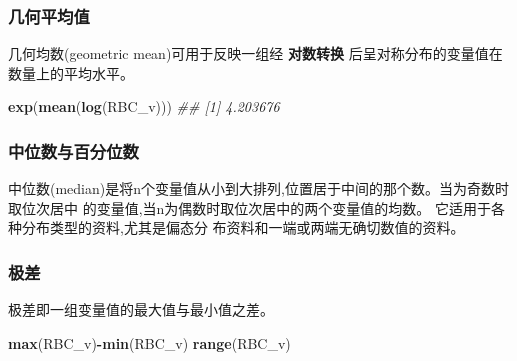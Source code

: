 \documentclass[
]{article}
\newenvironment{Shaded}{\begin{snugshade}}{\end{snugshade}}
\newcommand{\CommentTok}[1]{\textcolor[rgb]{0.56,0.35,0.01}{\textit{#1}}}
\newcommand{\FloatTok}[1]{\textcolor[rgb]{0.00,0.00,0.81}{#1}}
\newcommand{\KeywordTok}[1]{\textcolor[rgb]{0.13,0.29,0.53}{\textbf{#1}}}
\newcommand{\NormalTok}[1]{#1}
\newcommand{\OperatorTok}[1]{\textcolor[rgb]{0.81,0.36,0.00}{\textbf{#1}}}
\begin{document}
\hypertarget{ux51e0ux4f55ux5e73ux5747ux503c}{%
\subsubsection{几何平均值}\label{ux51e0ux4f55ux5e73ux5747ux503c}}

几何均数(geometric mean)可用于反映一组经 \textbf{对数转换} 后呈对称分布的变量值在数量上的平均水平。

\begin{Shaded}
\begin{Highlighting}[]
\KeywordTok{exp}\NormalTok{(}\KeywordTok{mean}\NormalTok{(}\KeywordTok{log}\NormalTok{(RBC_v)))}
\CommentTok{## [1] 4.203676}
\end{Highlighting}
\end{Shaded}

\hypertarget{ux4e2dux4f4dux6570ux4e0eux767eux5206ux4f4dux6570}{%
\subsubsection{中位数与百分位数}\label{ux4e2dux4f4dux6570ux4e0eux767eux5206ux4f4dux6570}}

中位数(median)是将n个变量值从小到大排列,位置居于中间的那个数。当为奇数时取位次居中 的变量值,当n为偶数时取位次居中的两个变量值的均数。
它适用于各种分布类型的资料,尤其是偏态分 布资料和一端或两端无确切数值的资料。

\begin{Shaded}
\end{Shaded}

\hypertarget{ux6781ux5dee}{%
\subsubsection{极差}\label{ux6781ux5dee}}

极差即一组变量值的最大值与最小值之差。

\begin{Shaded}
\begin{Highlighting}[]
\KeywordTok{max}\NormalTok{(RBC_v)}\OperatorTok{-}\KeywordTok{min}\NormalTok{(RBC_v)}
\KeywordTok{range}\NormalTok{(RBC_v)}
\end{Highlighting}
\end{Shaded}
\end{document}
